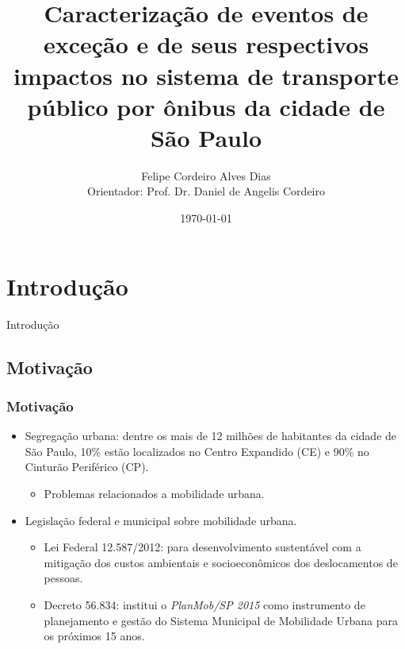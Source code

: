 \documentclass{beamer}
\title[Defesa de Mestrado]{Caracterização de eventos de exceção e de seus respectivos impactos no sistema de transporte público por ônibus da cidade de São Paulo} %
\author[DIAS, F.; CORDEIRO, D.]{Felipe Cordeiro Alves Dias\\[1mm]Orientador: Prof. Dr. Daniel de Angelis Cordeiro}
\institute[USP-EACH] %
{
Universidade de São Paulo \\ %
\medskip
}
\date{\today} %
\begin{document}
\begin{frame}
\titlepage %
\end{frame}

\section{Introdução}
\begin{frame}
\Huge{\centerline{Introdução}}
\end{frame}
\subsection{Motivação}
\begin{frame}
\frametitle{Motivação}
\begin{itemize}
\item Segregação urbana: dentre os mais de 12 milhões de habitantes da cidade de São Paulo, 10\% estão localizados no Centro Expandido (CE) e 90\% no Cinturão Periférico (CP).
\begin{itemize}
\item Problemas relacionados a mobilidade urbana.
\end{itemize}
\end{itemize}

\begin{itemize}
\item Legislação federal e municipal sobre mobilidade urbana.
\begin{itemize}
\item Lei Federal 12.587/2012: para desenvolvimento sustentável com a mitigação dos custos ambientais e socioeconômicos dos deslocamentos de pessoas.
\item Decreto 56.834: institui o \textit{PlanMob/SP 2015} como instrumento de planejamento e gestão do Sistema Municipal de Mobilidade Urbana para os próximos 15 anos.
\end{itemize}
\end{itemize}

\end{frame}
\end{document}
